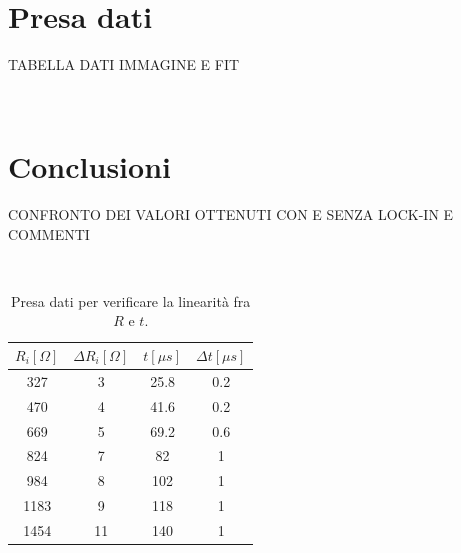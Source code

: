 \documentclass[10pt,a4paper]{article}
\begin{document}
\\
\section{Presa dati}

TABELLA DATI
IMMAGINE E FIT


\\

\section{Conclusioni}

CONFRONTO DEI VALORI OTTENUTI CON E SENZA LOCK-IN E COMMENTI

\\
\begin{table}[!htb]
\centering
\begin{tabular}{|c|c|c|c|}
\hline 
$R_i [\Omega ]$ & $\Delta R_i [\Omega ]$ & $t [\mu s]$ & $\Delta t [\mu s]$\\
\hline
 327 &  3 & 25.8 & 0.2\\ 
\hline 
 470 &  4 & 41.6 & 0.2\\ 
\hline
 669 &  5 & 69.2 & 0.6\\ 
\hline
 824 &  7 & 82 & 1\\ 
\hline 
 984 &  8 & 102 & 1\\ 
\hline
 1183 &  9 & 118 & 1\\ 
\hline
 1454 &  11 & 140 & 1\\ 
\hline
\end{tabular} 
\caption{Presa dati per verificare la linearità fra $R$ e $t$.\label{tab:monostabile}}
\end{table}
\end{document}
